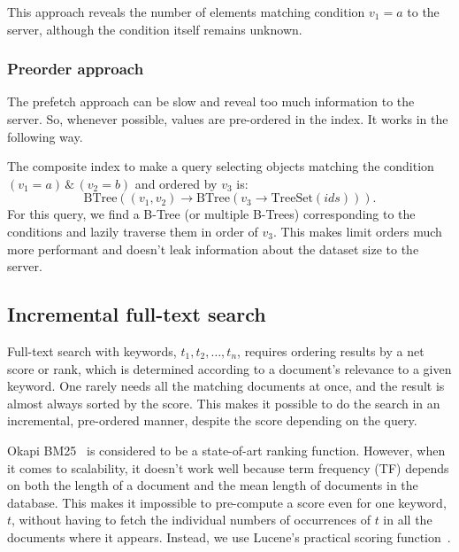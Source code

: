 \documentclass[notitlepage,longbibliography]{revtex4-1}
\begin{document}
This approach reveals the number of elements matching condition $v_1=a$ to the server, although the condition itself remains unknown.

\subsubsection{Preorder approach}

The prefetch approach can be slow and reveal too much information to the server.
So, whenever possible, values are pre-ordered in the index.
It works in the following way.

The composite index to make a query selecting objects matching the condition $(v_1 = a) \,\&\, (v_2 = b)$ and ordered by $v_3$ is:
\begin{equation*}
    \mbox{BTree}((v_1, v_2) \rightarrow \mbox{BTree}(v_3 \rightarrow \mbox{TreeSet}(ids))).
\end{equation*}
For this query, we find a B-Tree (or multiple B-Trees) corresponding to the conditions and lazily traverse them in order of $v_3$.
This makes limit orders much more performant and doesn't leak information about the dataset size to the server.

\subsection{Incremental full-text search}
\label{sec:fulltext}

Full-text search with keywords, $t_1, t_2,\ldots, t_n$, requires ordering results by a net score or rank, which is determined according to a document's relevance to a given keyword.
One rarely needs all the matching documents at once, and the result is almost always sorted by the score.
This makes it possible to do the search in an incremental, pre-ordered manner, despite the score depending on the query.

Okapi BM25~\cite{wiki:OkapiBM25} is considered to be a state-of-art ranking function.
However, when it comes to scalability, it doesn't work well because term frequency (TF) depends on both the length of a document
and the mean length of documents in the database.
This makes it impossible to pre-compute a score even for one keyword, $t$, without having to fetch the individual numbers of occurrences of $t$
in all the documents where it appears.
Instead, we use Lucene's practical scoring function~\cite{lucene-practical-scoring}.
\end{document}
